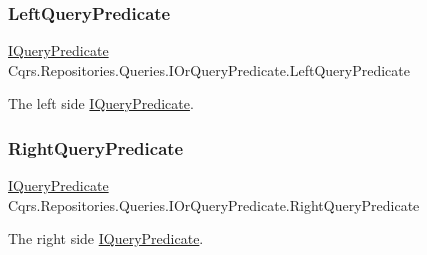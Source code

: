 \subsubsection{\texorpdfstring{Left\+Query\+Predicate}{LeftQueryPredicate}}
{\footnotesize\ttfamily \hyperlink{interfaceCqrs_1_1Repositories_1_1Queries_1_1IQueryPredicate}{I\+Query\+Predicate} Cqrs.\+Repositories.\+Queries.\+I\+Or\+Query\+Predicate.\+Left\+Query\+Predicate\hspace{0.3cm}{\ttfamily [get]}}



The left side \hyperlink{interfaceCqrs_1_1Repositories_1_1Queries_1_1IQueryPredicate}{I\+Query\+Predicate}. 

\mbox{\label{interfaceCqrs_1_1Repositories_1_1Queries_1_1IOrQueryPredicate_a72ad26892989a09527ead9a2ecce5d47_a72ad26892989a09527ead9a2ecce5d47}} 
\subsubsection{\texorpdfstring{Right\+Query\+Predicate}{RightQueryPredicate}}
{\footnotesize\ttfamily \hyperlink{interfaceCqrs_1_1Repositories_1_1Queries_1_1IQueryPredicate}{I\+Query\+Predicate} Cqrs.\+Repositories.\+Queries.\+I\+Or\+Query\+Predicate.\+Right\+Query\+Predicate\hspace{0.3cm}{\ttfamily [get]}}



The right side \hyperlink{interfaceCqrs_1_1Repositories_1_1Queries_1_1IQueryPredicate}{I\+Query\+Predicate}. 

